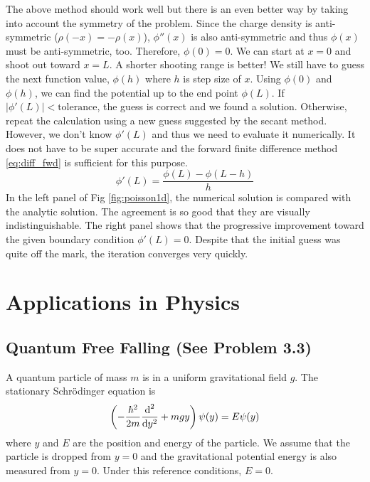 \begin{example}
The above method should work well but there is an even better way by taking into account the symmetry of the problem.  Since the charge density is anti-symmetric ($\rho(-x) = -\rho(x)$),  $\phi''(x)$ is also anti-symmetric and thus $\phi(x)$ must be anti-symmetric, too.  Therefore, $\phi(0)=0$.  We can start at $x=0$ and shoot out toward $x=L$. A shorter shooting range is better!  We still have to guess the next function value, $\phi(h)$ where $h$ is step size of $x$. Using $\phi(0)$ and $\phi(h)$, we can find the potential up to the end point $\phi(L)$.  If $|\phi'(L)| < \text{tolerance}$, the guess is correct and we found a solution. Otherwise, repeat the calculation using a new guess suggested by the secant method.  However, we don't know $\phi'(L)$ and thus we need to evaluate it numerically. It does not have to be super accurate and the forward finite difference method \eqref{eq:diff_fwd} is sufficient for this purpose.
\begin{equation}
\phi'(L) = \frac{\phi(L)-\phi(L-h)}{h}
 \end{equation}
In the left panel of Fig \ref{fig:poisson1d}, the numerical solution is compared with the analytic solution. The agreement is so good that they are visually indistinguishable. The right panel shows that the progressive improvement toward the given boundary condition $\phi'(L)=0$.  Despite that the initial guess was quite off the mark, the iteration converges very quickly.
\end{example}

\noindent
\section{Applications in Physics}

\subsection{Quantum Free Falling (See Problem 3.3)}

A quantum particle of mass $m$ is in a uniform gravitational field $g$.  The stationary Schr\"{o}dinger equation is 
\begin{equation}\label{eq:quantum_falling}
\left ( -\frac{\hbar^2}{2m} \frac{\text{d}^2}{\text{d} y^2} + m g y \right ) \psi(y) = E \psi(y)
\end{equation}
where $y$ and $E$ are the position and energy of the particle.  We assume that the particle is dropped from $y=0$ and the gravitational potential energy is also measured from $y=0$.  Under this reference conditions, $E=0$.

